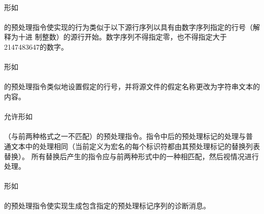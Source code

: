 \paragraph{}
形如                                                                          \\
\mbox{\hspace{4em} }                  \\
的预处理指令使实现的行为类似于以下源行序列以具有由数字序列指定的行号（解释为十进
制整数）的源行开始。数字序列不得指定零，也不得指定大于2147483647的数字。

\paragraph{}
形如                                                                          \\
\mbox{\hspace{4em} 
  \tm{\dq}\tm{\dq} }               \\
的预处理指令类似地设置假定的行号，并将源文件的假定名称更改为字符串文本的内容。

\paragraph{}
允许形如                                                                      \\
\mbox{\hspace{4em} }                       \\
（与前两种格式之一不匹配）的预处理指令。指令中后的预处理标记的处理与普
通文本中的处理相同（当前定义为宏名的每个标识符都由其预处理标记的替换列表替换）。
所有替换后产生的指令应与前两种形式中的一种相匹配，然后视情况进行处理。

\semantic
\paragraph{}
形如                                                                          \\
\mbox{\hspace{4em} }            \\
的预处理指令使实现生成包含指定的预处理标记序列的诊断消息。


